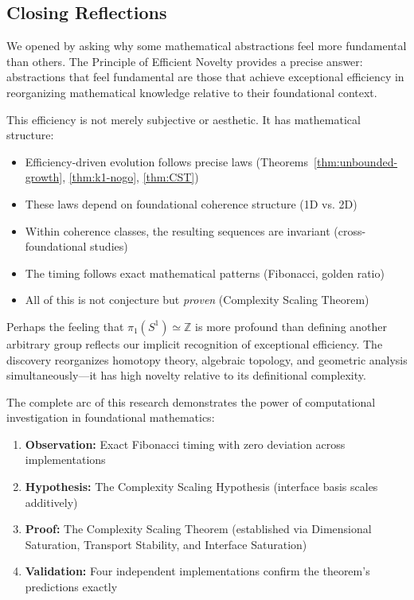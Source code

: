 \documentclass[11pt]{article}
\theoremstyle{definition}
\theoremstyle{remark}
\begin{document}
\subsection{Closing Reflections}

We opened by asking why some mathematical abstractions feel more fundamental than others. The
Principle of Efficient Novelty provides a precise answer: abstractions that feel fundamental are
those that achieve exceptional efficiency in reorganizing mathematical knowledge relative to their
foundational context.

This efficiency is not merely subjective or aesthetic. It has mathematical structure:

\begin{itemize}
\item Efficiency-driven evolution follows precise laws (Theorems~\ref{thm:unbounded-growth},
\ref{thm:k1-nogo}, \ref{thm:CST})
\item These laws depend on foundational coherence structure (1D vs. 2D)
\item Within coherence classes, the resulting sequences are invariant (cross-foundational studies)
\item The timing follows exact mathematical patterns (Fibonacci, golden ratio)
\item All of this is not conjecture but \emph{proven} (Complexity Scaling Theorem)
\end{itemize}

Perhaps the feeling that $\pi_1(S^1) \simeq \mathbb{Z}$ is more profound than defining another arbitrary group
reflects our implicit recognition of exceptional efficiency. The discovery reorganizes homotopy theory,
algebraic topology, and geometric analysis simultaneously---it has high novelty relative to its
definitional complexity.

The complete arc of this research demonstrates the power of computational investigation in
foundational mathematics:

\begin{enumerate}
\item \textbf{Observation:} Exact Fibonacci timing with zero deviation across implementations
\item \textbf{Hypothesis:} The Complexity Scaling Hypothesis (interface basis scales additively)
\item \textbf{Proof:} The Complexity Scaling Theorem (established via Dimensional Saturation,
Transport Stability, and Interface Saturation)
\item \textbf{Validation:} Four independent implementations confirm the theorem's predictions exactly
\end{enumerate}
\end{document}
